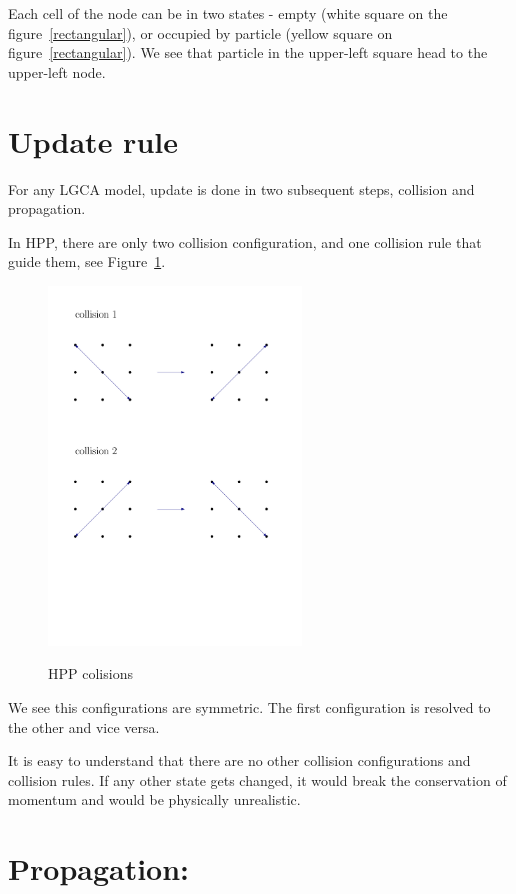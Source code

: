 Each cell of the node can be in two states - empty (white square on the figure~\ref{rectangular}), or occupied by particle (yellow square on figure~\ref{rectangular}).
We see that particle in the upper-left square head to the upper-left node.


\section{Update rule}
For any LGCA model, update is done in two subsequent steps, collision and propagation.

In HPP, there are only two collision configuration, and one collision rule that guide them, see Figure~\ref{hpp-colision}.

\begin{figure}
 \centering
 \includegraphics[width=0.6\textwidth]{./img/hppcol1}
 \label{hpp-colision}
 \caption{HPP colisions}
\end{figure}

We see this configurations are symmetric. The first configuration is resolved to the other and vice versa.

It is easy to understand that there are no other collision configurations and collision rules. If any other state gets changed, it would break the conservation of momentum and would be physically unrealistic.

\section{Propagation:}

